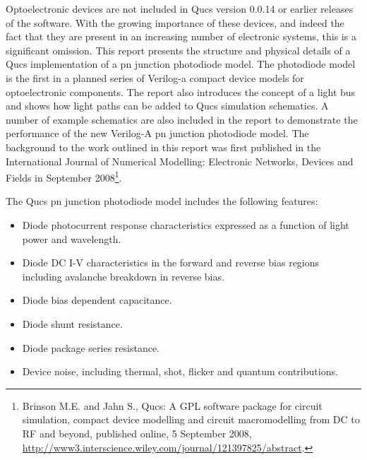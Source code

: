 %
%
%
%

\renewcommand{\thesubfigure}{\thefigure(\alph{subfigure})}
\makeatletter
  \renewcommand{\@thesubfigure}{\thesubfigure:\space}
  \renewcommand{\p@subfigure}{}
\makeatother

\renewcommand{\thesubtable}{\thetable(\alph{subtable})} 
\makeatletter
  \renewcommand{\@thesubtable}{\thesubtable:\space}
  \renewcommand{\p@subtable}{}
\makeatother

Optoelectronic devices are not included in Qucs version 0.0.14 or
earlier releases of the software. With the growing importance of these
devices, and indeed the fact that they are present in an increasing
number of electronic systems, this is a significant omission. This
report presents the structure and physical details of a Qucs
implementation of a pn junction photodiode model. The photodiode model
is the first in a planned series of Verilog-a compact device models
for optoelectronic components. The report also introduces the concept
of a light bus and shows how light paths can be added to Qucs
simulation schematics. A number of example schematics are also
included in the report to demonstrate the performance of the new
Verilog-A pn junction photodiode model. The background to the work
outlined in this report was first published in the International
Journal of Numerical Modelling: Electronic Networks, Devices and
Fields in September 2008\footnote{Brinson M.E. and Jahn S., Qucs: A
GPL software package for circuit simulation, compact device modelling
and circuit macromodelling from DC to RF and beyond, published online,
5 September 2008,
\url{http://www3.interscience.wiley.com/journal/121397825/abstract}.}.

The Qucs pn junction photodiode model includes the following features:
\begin{itemize}
 \item Diode photocurrent response characteristics expressed as a function of light power and wavelength.
 \item Diode DC I-V characteristics in the forward and reverse bias regions including avalanche breakdown in  reverse bias.
 \item Diode bias dependent capacitance.
 \item Diode shunt resistance.
 \item Diode package series resistance.
 \item Device noise, including thermal, shot, flicker and quantum contributions.  
\end{itemize}

